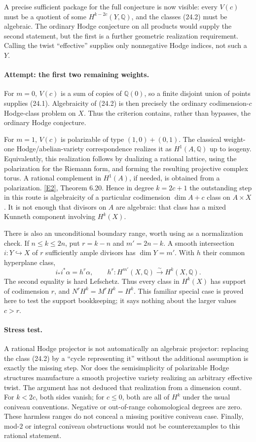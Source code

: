 \documentclass[11pt,a4paper]{article}
\newcommand{\Q}{\mathbb{Q}}
\newcommand{\eref}[2]{\hyperlink{extra:#1:#2}{[E#2]}}
\begin{document}
A precise sufficient package for the full conjecture is now visible:
every $V(c)$ must be a quotient of some $H^{k-2c}(Y,\Q)$, and the classes
(24.2) must be algebraic. The ordinary Hodge conjecture on all products
would supply the second statement, but the first is a further geometric
realization requirement. Calling the twist ``effective'' supplies only
nonnegative Hodge indices, not such a $Y$.

\paragraph{Attempt: the first two remaining weights.}
For $m=0$, $V(c)$ is a sum of copies of $\Q(0)$, so a finite disjoint union
of points supplies (24.1). Algebraicity of (24.2) is then precisely the
ordinary codimension-$c$ Hodge-class problem on $X$. Thus the criterion
contains, rather than bypasses, the ordinary Hodge conjecture.

For $m=1$, $V(c)$ is polarizable of type $(1,0)+(0,1)$. The classical
weight-one Hodge/abelian-variety correspondence realizes it as $H^1(A,\Q)$
up to isogeny. Equivalently, this realization follows by dualizing a
rational lattice, using the polarization for the Riemann form, and forming
the resulting projective complex torus. A rational complement in
$H^1(A)$, if needed, is obtained from a polarization. \eref{30000968}{2}, Theorem 6.20.
Hence in degree $k=2c+1$ the outstanding step in this route is algebraicity
of a particular codimension $\dim A+c$ class on $A\times X$.
It is not enough that divisors on $A$ are algebraic: that class has a mixed
Kunneth component involving $H^k(X)$.

There is also an unconditional boundary range, worth using as a normalization
check. If $n\leq k\leq2n$, put $r=k-n$ and $m'=2n-k$. A smooth intersection
$i:Y\hookrightarrow X$ of $r$ sufficiently ample divisors has
$\dim Y=m'$. With $h$ their common hyperplane class,
\[
 i_*i^*\alpha=h^r\alpha,\qquad
 h^r:H^{m'}(X,\Q)\xrightarrow{\sim}H^k(X,\Q).
 \tag{24.4}
\]
The second equality is hard Lefschetz. Thus every class in $H^k(X)$ has
support of codimension $r$, and
$N^rH^k=M^rH^k=H^k$. This familiar special case is proved here to test the
support bookkeeping; it says nothing about the larger values $c>r$.

\paragraph{Stress test.}
A rational Hodge projector is not automatically an algebraic projector:
replacing the class (24.2) by a ``cycle representing it'' without the
additional assumption is exactly the missing step. Nor does the
semisimplicity of polarizable Hodge structures manufacture a smooth
projective variety realizing an arbitrary effective twist. The argument
has not deduced that realization from a dimension count.
For $k<2c$, both sides vanish; for $c\leq0$, both are all of $H^k$ under
the usual coniveau conventions. Negative or out-of-range cohomological
degrees are zero. These harmless ranges do not conceal a missing positive
coniveau case. Finally, mod-$2$ or integral coniveau obstructions would not
be counterexamples to this rational statement.
\end{document}
